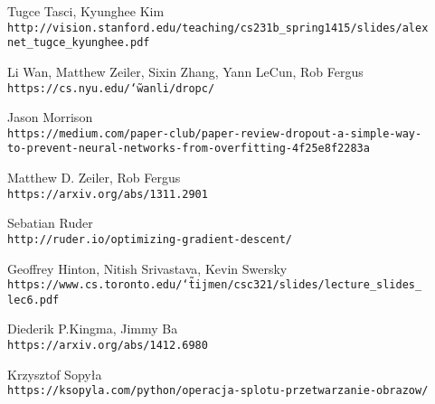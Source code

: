 \begin{thebibliography}{99}
Tugce Tasci, Kyunghee Kim
\\\texttt{http://vision.stanford.edu/teaching/cs231b\_spring1415/slides/alex\\net\_tugce\_kyunghee.pdf}

Li Wan, Matthew Zeiler, Sixin Zhang, Yann LeCun, Rob Fergus
\\\texttt{https://cs.nyu.edu/\char`\~wanli/dropc/}

Jason Morrison
\\\texttt{https://medium.com/paper-club/paper-review-dropout-a-simple-way-\\to-prevent-neural-networks-from-overfitting-4f25e8f2283a}

Matthew D. Zeiler, Rob Fergus
\\\texttt{https://arxiv.org/abs/1311.2901}

Sebatian Ruder
\\\texttt{http://ruder.io/optimizing-gradient-descent/}

Geoffrey Hinton, Nitish Srivastava, Kevin Swersky
\\\texttt{https://www.cs.toronto.edu/\char`\~tijmen/csc321/slides/lecture\_slides\_\\lec6.pdf}

Diederik P.Kingma, Jimmy Ba
\\\texttt{https://arxiv.org/abs/1412.6980}

Krzysztof Sopyła
\\\texttt{https://ksopyla.com/python/operacja-splotu-przetwarzanie-obrazow/}

\end{thebibliography}

